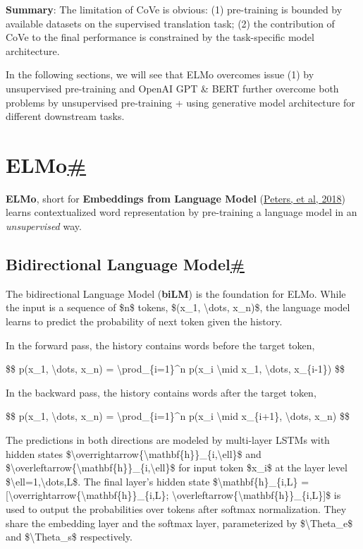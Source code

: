 \textbf{Summary}: The limitation of CoVe is obvious: (1) pre-training is bounded by available datasets on the supervised translation task; (2) the contribution of CoVe to the final performance is constrained by the task-specific model architecture.

In the following sections, we will see that ELMo overcomes issue (1) by unsupervised pre-training and OpenAI GPT \& BERT further overcome both problems by unsupervised pre-training + using generative model architecture for different downstream tasks.

\section{\texorpdfstring{ELMo\hyperref[elmo]{\#}}{ELMo\#}}\label{elmo}

\textbf{ELMo}, short for \textbf{Embeddings from Language Model} (\href{https://arxiv.org/abs/1802.05365}{Peters, et al, 2018}) learns contextualized word representation by pre-training a language model in an \emph{unsupervised} way.

\subsection{\texorpdfstring{Bidirectional Language Model\hyperref[bidirectional-language-model]{\#}}{Bidirectional Language Model\#}}\label{bidirectional-language-model}

The bidirectional Language Model (\textbf{biLM}) is the foundation for ELMo. While the input is a sequence of \$n\$ tokens, \$(x\_1, \textbackslash dots, x\_n)\$, the language model learns to predict the probability of next token given the history.

In the forward pass, the history contains words before the target token,

\$\$ p(x\_1, \textbackslash dots, x\_n) = \textbackslash prod\_\{i=1\}\^{}n p(x\_i \textbackslash mid x\_1, \textbackslash dots, x\_\{i-1\}) \$\$

In the backward pass, the history contains words after the target token,

\$\$ p(x\_1, \textbackslash dots, x\_n) = \textbackslash prod\_\{i=1\}\^{}n p(x\_i \textbackslash mid x\_\{i+1\}, \textbackslash dots, x\_n) \$\$

The predictions in both directions are modeled by multi-layer LSTMs with hidden states \$\textbackslash overrightarrow\{\textbackslash mathbf\{h\}\}\_\{i,\textbackslash ell\}\$ and \$\textbackslash overleftarrow\{\textbackslash mathbf\{h\}\}\_\{i,\textbackslash ell\}\$ for input token \$x\_i\$ at the layer level \$\textbackslash ell=1,\textbackslash dots,L\$. The final layer's hidden state \$\textbackslash mathbf\{h\}\_\{i,L\} = {[}\textbackslash overrightarrow\{\textbackslash mathbf\{h\}\}\_\{i,L\}; \textbackslash overleftarrow\{\textbackslash mathbf\{h\}\}\_\{i,L\}{]}\$ is used to output the probabilities over tokens after softmax normalization. They share the embedding layer and the softmax layer, parameterized by \$\textbackslash Theta\_e\$ and \$\textbackslash Theta\_s\$ respectively.


